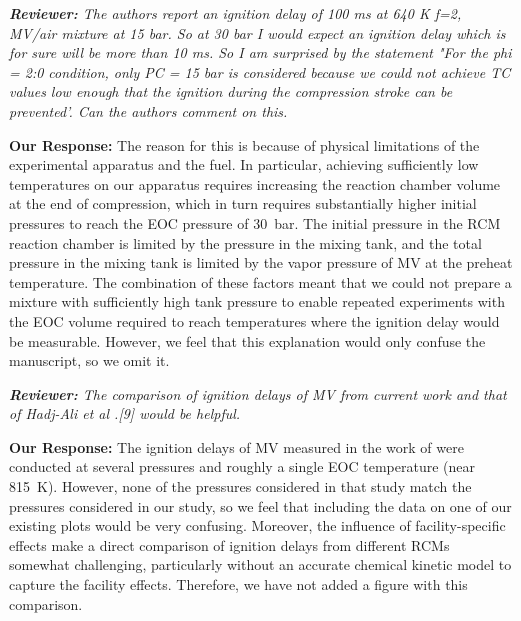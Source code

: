 \documentclass{article}
\newenvironment{reviewer}{\vspace{0.5\baselineskip}\begingroup\itshape\textbf{Reviewer:}}{\endgroup\vspace{0.5\baselineskip}}
\newenvironment{response}{\vspace{0.5\baselineskip}\textbf{Our Response:}}{\vspace{0.5\baselineskip}}
\begin{document}
\begin{reviewer}
    The authors report an ignition delay of 100 ms at 640 K f=2, MV/air mixture at 15 bar. So at 30
    bar I would expect an ignition delay which is for sure will be more than 10 ms. So I am
    surprised by the statement "For the phi = 2:0 condition, only  PC = 15 bar is considered because
    we could not achieve TC values low enough that the ignition during the compression stroke can be
    prevented'. Can the authors comment on this.
\end{reviewer}

\begin{response}
    The reason for this is because of physical limitations of the experimental apparatus and the
    fuel. In particular, achieving sufficiently low temperatures on our apparatus requires
    increasing the reaction chamber volume at the end of compression, which in turn requires
    substantially higher initial pressures to reach the EOC pressure of \SI{30}{\bar}. The initial
    pressure in the RCM reaction chamber is limited by the pressure in the mixing tank, and the
    total pressure in the mixing tank is limited by the vapor pressure of MV at the preheat
    temperature. The combination of these factors meant that we could not prepare a mixture with
    sufficiently high tank pressure to enable repeated experiments with the EOC volume required to
    reach temperatures where the ignition delay would be measurable. However, we feel that this
    explanation would only confuse the manuscript, so we omit it.
\end{response}

\begin{reviewer}
    The comparison of ignition delays of MV from current work and that of Hadj-Ali et al .[9] would
    be helpful.
\end{reviewer}

\begin{response}
    The ignition delays of MV measured in the work of \citet{Hadj-Ali2009} were conducted at several
    pressures and roughly a single EOC temperature (near \SI{815}{\K}). However, none of the
    pressures considered in that study match the pressures considered in our study, so we feel that
    including the data on one of our existing plots would be very confusing. Moreover, the influence
    of facility-specific effects make a direct comparison of ignition delays from different RCMs
    somewhat challenging, particularly without an accurate chemical kinetic model to capture the
    facility effects. Therefore, we have not added a figure with this comparison.
\end{response}
\end{document}
